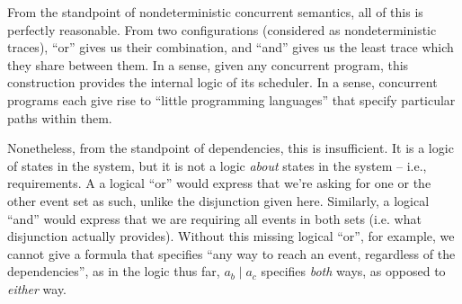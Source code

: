 \documentclass[hoptionsi,review,screen,format=sigconf]{acmart}
\theoremstyle{definition}
\newcommand{\bor}{\mathop{|}}
\begin{document}


From the standpoint of nondeterministic concurrent semantics, all of this is perfectly reasonable. From two configurations (considered as nondeterministic traces), ``or'' gives us their combination, and ``and'' gives us the least trace which they share between them. In a sense, given any concurrent program, this construction provides the internal logic of its scheduler. In a sense, concurrent programs each give rise to ``little programming languages'' that specify particular paths within them.

Nonetheless, from the standpoint of dependencies, this is insufficient. It is a logic of states in the system, but it is not a logic \textit{about} states in the system -- i.e., requirements. A a logical ``or''  would express that we're asking for one or the other event set as such, unlike the disjunction given here. Similarly, a logical ``and'' would express that we are requiring all events in both sets (i.e. what disjunction actually provides). Without this missing logical ``or'', for example, we cannot give a formula that specifies ``any way to reach an event, regardless of the dependencies'', as in the logic thus far, \(a_b \bor a_c\) specifies \textit{both} ways, as opposed to \textit{either} way.
\end{document}
